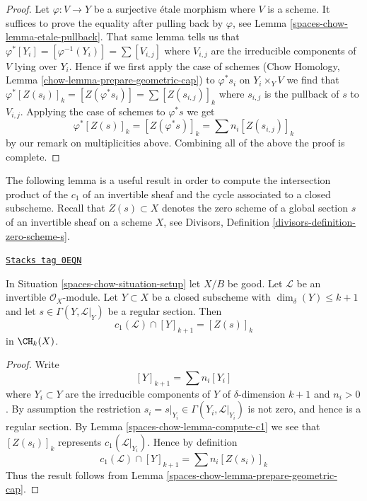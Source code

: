 \begin{proof}
Let $\varphi : V \to Y$ be a surjective \'etale morphism where $V$
is a scheme. It suffices to prove the equality after pulling back
by $\varphi$, see Lemma \ref{spaces-chow-lemma-etale-pullback}.
That same lemma tells us that
$\varphi^*[Y_i] = [\varphi^{-1}(Y_i)] = \sum [V_{i, j}]$
where $V_{i, j}$ are the irreducible components of $V$ lying over $Y_i$.
Hence if we first apply the case of schemes
(Chow Homology, Lemma \ref{chow-lemma-prepare-geometric-cap}) to
$\varphi^*s_i$ on $Y_i \times_Y V$ we
find that $\varphi^*[Z(s_i)]_k = [Z(\varphi^*s_i)] =
\sum [Z(s_{i, j})]_k$ where $s_{i, j}$ is the pullback
of $s$ to $V_{i, j}$. Applying the case of schemes to $\varphi^*s$ we get
$$
\varphi^*[Z(s)]_k =
[Z(\varphi^*s)]_k =
\sum n_i[Z(s_{i, j})]_k
$$
by our remark on multiplicities above.
Combining all of the above the proof is complete.
\end{proof}

The following lemma is a useful result in order to compute the intersection
product of the $c_1$ of an invertible sheaf and the cycle associated
to a closed subscheme.
Recall that $Z(s) \subset X$ denotes the zero scheme of a global section
$s$ of an invertible sheaf on a scheme $X$, see
Divisors, Definition \ref{divisors-definition-zero-scheme-s}.

\begin{lemma}
\label{spaces-chow-lemma-geometric-cap}
\href{https://stacks.math.columbia.edu/tag/0EQN}{\texttt{Stacks tag 0EQN}}

In Situation \ref{spaces-chow-situation-setup} let $X/B$ be good.
Let $\mathcal{L}$ be an invertible $\mathcal{O}_X$-module.
Let $Y \subset X$ be a closed subscheme with
$\dim_\delta(Y) \leq k + 1$ and let $s \in \Gamma(Y, \mathcal{L}|_Y)$
be a regular section. Then
$$
c_1(\mathcal{L}) \cap [Y]_{k + 1} = [Z(s)]_k
$$
in $\CH_k(X)$.
\end{lemma}

\begin{proof}
Write
$$
[Y]_{k + 1} = \sum n_i[Y_i]
$$
where $Y_i \subset Y$ are the irreducible components of
$Y$ of $\delta$-dimension $k + 1$ and $n_i > 0$.
By assumption the restriction
$s_i = s|_{Y_i} \in \Gamma(Y_i, \mathcal{L}|_{Y_i})$ is not
zero, and hence is a regular section. By Lemma \ref{spaces-chow-lemma-compute-c1}
we see that $[Z(s_i)]_k$ represents $c_1(\mathcal{L}|_{Y_i})$.
Hence by definition
$$
c_1(\mathcal{L}) \cap [Y]_{k + 1} = \sum n_i[Z(s_i)]_k
$$
Thus the result follows from Lemma \ref{spaces-chow-lemma-prepare-geometric-cap}.
\end{proof}

